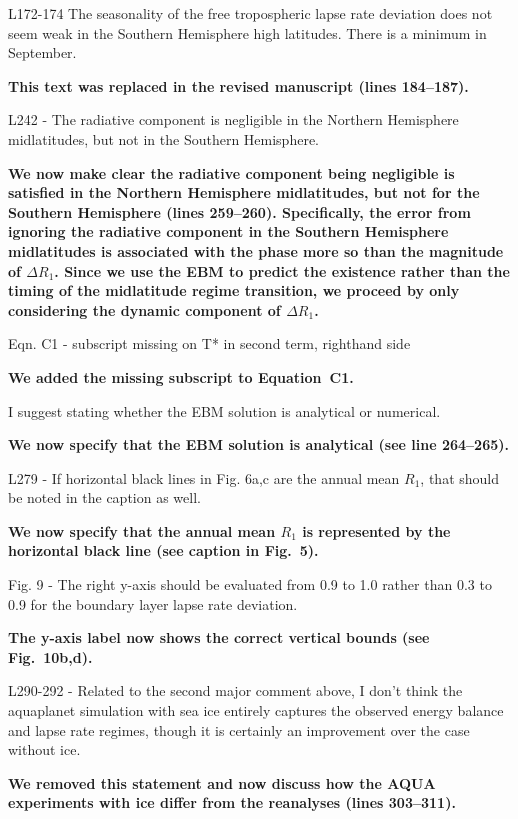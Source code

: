 \documentclass{article}
\begin{document}
L172-174 The seasonality of the free tropospheric lapse rate deviation does not seem weak in the Southern Hemisphere high latitudes. There is a minimum in September.

\textbf{This text was replaced in the revised manuscript (lines 184--187).}

L242 - The radiative component is negligible in the Northern Hemisphere midlatitudes, but not in the Southern Hemisphere.

\textbf{We now make clear the radiative component being negligible is satisfied in the Northern Hemisphere midlatitudes, but not for the Southern Hemisphere (lines 259--260). Specifically, the error from ignoring the radiative component in the Southern Hemisphere midlatitudes is associated with the phase more so than the magnitude of $\Delta R_1$. Since we use the EBM to predict the existence rather than the timing of the midlatitude regime transition, we proceed by only considering the dynamic component of $\Delta R_1$.}

Eqn. C1 - subscript missing on T* in second term, righthand side

\textbf{We added the missing subscript to Equation~C1.}

I suggest stating whether the EBM solution is analytical or numerical.

\textbf{We now specify that the EBM solution is analytical (see line 264--265).}

L279 - If horizontal black lines in Fig. 6a,c are the annual mean $R_1$, that should be noted in the caption as well.

\textbf{We now specify that the annual mean $R_1$ is represented by the horizontal black line (see caption in Fig.~5).}

Fig. 9 - The right y-axis should be evaluated from 0.9 to 1.0 rather than 0.3 to 0.9 for the boundary layer lapse rate deviation.

\textbf{The y-axis label now shows the correct vertical bounds (see Fig.~10b,d).}

L290-292 - Related to the second major comment above, I don't think the aquaplanet simulation with sea ice entirely captures the observed energy balance and lapse rate regimes, though it is certainly an improvement over the case without ice.

\textbf{We removed this statement and now discuss how the AQUA experiments with ice differ from the reanalyses (lines 303--311).}



\end{document}
